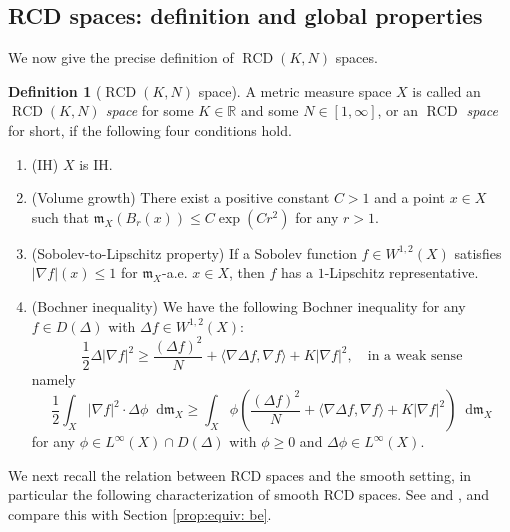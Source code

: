 \documentclass[11pt,reqno]{amsart}
\theoremstyle{definition}
\newtheorem{definition}[theorem]{Definition}
\numberwithin{equation}{section}
\newcommand{\di}{\mathop{}\!\mathrm{d}}
\newcommand{\meas}{\mathfrak{m}}
\DeclareMathOperator{\RCD}{RCD}
\begin{document}
\subsection{RCD spaces: definition and   global properties}
We now give the precise definition of $\RCD(K, N)$ spaces.
\begin{definition}[$\RCD(K, N)$ space]\label{defrcd}
A metric measure space $X$ is called an \textit{$\RCD(K, N)$ space} for some $K \in \mathbb{R}$ and some $N \in [1, \infty]$, or an \textit{$\RCD$ space} for short, if the following four conditions hold.
\begin{enumerate}
\item{(IH)} $X$ is IH.
\item{(Volume growth)} There exist a positive constant $C>1$ and a point $x \in X$ such that 
$
\meas_X(B_r(x))\le C\exp (Cr^2)$ for any $r>1$.
\item{(Sobolev-to-Lipschitz property)} If a Sobolev function $f \in W^{1,2}(X)$ satisfies $|\nabla f|(x) \le 1$ for $\meas_X$-a.e. $x \in X$, then $f$ has a $1$-Lipschitz representative.
\item{(Bochner inequality)} We have the following Bochner inequality for any $f \in D(\Delta)$ with $\Delta f \in W^{1,2}(X)$:
\begin{equation}
\frac{1}{2}\Delta |\nabla f|^2 \ge \frac{(\Delta f)^2}{N}+\langle \nabla \Delta f, \nabla f\rangle +K|\nabla f|^2,\quad \text{in a weak sense}
\end{equation}
namely
\begin{equation}\label{s8sabasyaaassss}
\frac{1}{2}\int_X|\nabla f|^2 \cdot \Delta \phi \di \meas_X \ge \int_X\phi \left( \frac{(\Delta f)^2}{N} +\langle \nabla \Delta f, \nabla f\rangle +K|\nabla f|^2 \right)\di \meas_X
\end{equation}
for any $\phi \in L^{\infty}(X) \cap D(\Delta)$ with $\phi \ge 0$ and $\Delta \phi \in L^{\infty}(X)$.
\end{enumerate}
\end{definition}



We next recall the relation between RCD spaces and the smooth setting, in particular the following characterization of smooth RCD spaces. See \cite[Proposition 4.21]{EKS} and \cite[Corollary 2.6]{Han}, and compare this with Section \ref{prop:equiv: be}.
\end{document}
